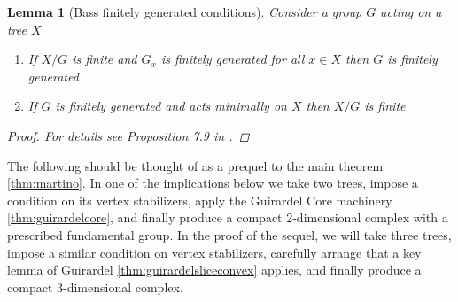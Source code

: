 \documentclass[12pt,parskip=full]{report}
\theoremstyle{plain}
\newtheorem{lem}[thm]{Lemma}
\theoremstyle{definition}
\begin{document}

\begin{lem}
    [Bass finitely generated conditions]
    \label{lem:bassfgcon}
    Consider a group \(G\) acting on a tree \(X\)
    \begin{enumerate}
        \item If \(X/G\) is finite and \(G_x\) is finitely generated for all \(x\in X\) then \(G\) is finitely generated
        \item If \(G\) is finitely generated and acts minimally on \(X\) then \(X/G\) is finite
    \end{enumerate}
    \begin{proof}
        For details see Proposition 7.9 in \cite{hymanbass}.
    \end{proof}
\end{lem}

The following should be thought of as a prequel to the main theorem \ref{thm:martino}. In one of the implications below we take two trees, impose a condition on its vertex stabilizers, apply the Guirardel Core machinery \ref{thm:guirardelcore}, and finally produce a compact 2-dimensional complex with a prescribed fundamental group. In the proof of the sequel, we will take three trees, impose a similar condition on vertex stabilizers, carefully arrange that a key lemma of Guirardel \ref{thm:guirardelsliceconvex} applies, and finally produce a compact 3-dimensional complex.
\end{document}
